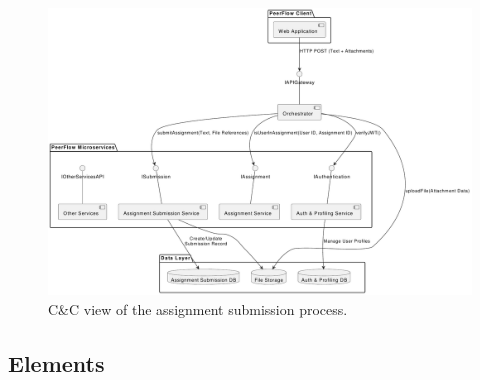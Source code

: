 \begin{figure}[h]
    \centering
    \includegraphics[width=0.9\linewidth]{Architettura/imgs/assign_submission_cnc.pdf}
    \caption{C\&C view of the assignment submission process.}
    \label{fig:ccAssignmentSubmission}
\end{figure}

\subsection{Elements}

